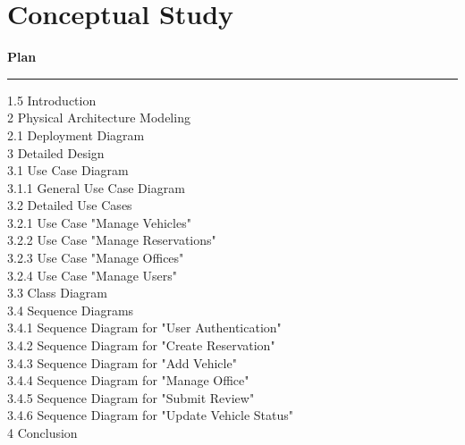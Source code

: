 \chapter{Conceptual Study}

\noindent\textbf{\LARGE Plan}
\begin{center}
    \rule[0.5ex]{1\columnwidth}{1pt}
\end{center}

\begin{spacing}{1.5}
\normalsize
{} Introduction \\
2 Physical Architecture Modeling \\
\hspace*{0.5cm}2.1 Deployment Diagram \\
3 Detailed Design \\
\hspace*{0.5cm}3.1 Use Case Diagram \\
\hspace*{1cm}3.1.1 General Use Case Diagram \\
\hspace*{0.5cm}3.2 Detailed Use Cases \\
\hspace*{1cm}3.2.1 Use Case "Manage Vehicles" \\
\hspace*{1cm}3.2.2 Use Case "Manage Reservations" \\
\hspace*{1cm}3.2.3 Use Case "Manage Offices" \\
\hspace*{1cm}3.2.4 Use Case "Manage Users" \\
\hspace*{0.5cm}3.3 Class Diagram \\
\hspace*{0.5cm}3.4 Sequence Diagrams \\
\hspace*{1cm}3.4.1 Sequence Diagram for "User Authentication" \\
\hspace*{1cm}3.4.2 Sequence Diagram for "Create Reservation" \\
\hspace*{1cm}3.4.3 Sequence Diagram for "Add Vehicle" \\
\hspace*{1cm}3.4.4 Sequence Diagram for "Manage Office" \\
\hspace*{1cm}3.4.5 Sequence Diagram for "Submit Review" \\
\hspace*{1cm}3.4.6 Sequence Diagram for "Update Vehicle Status" \\
4 Conclusion 
\end{spacing}

